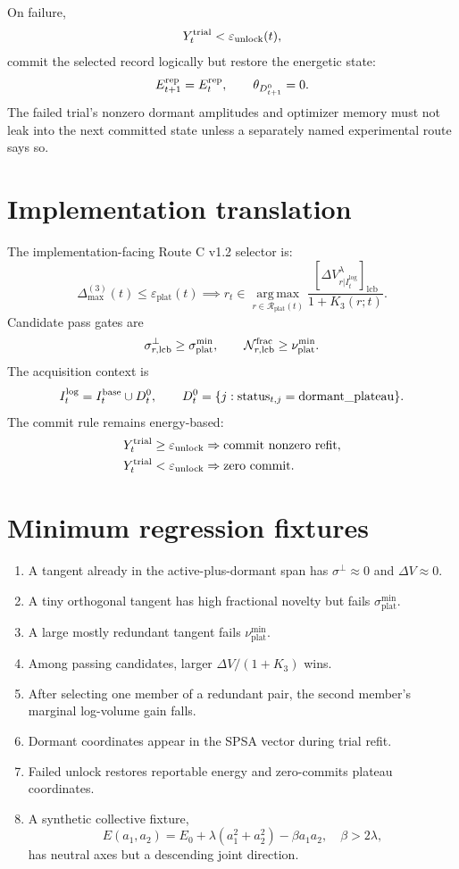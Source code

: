 \documentclass[10pt,twocolumn]{article}
\newcommand{\argmax}{\operatorname*{arg\,max}}
\newcommand{\eps}{\varepsilon}
\newcommand{\lcb}{\mathrm{lcb}}
\newcommand{\plat}{\mathrm{plat}}
\newcommand{\logi}{\mathrm{log}}
\begin{document}
On failure,
\[
Y_t^{\rm trial}<\eps_{\rm unlock}(t),
\]
commit the selected record logically but restore the energetic state:
\[
E_{t+1}^{\rm rep}=E_t^{\rm rep},
\qquad
\theta_{D_{t+1}^0}=0.
\]
The failed trial's nonzero dormant amplitudes and optimizer memory must not leak
into the next committed state unless a separately named experimental route says
so.

\section{Implementation translation}

The implementation-facing Route C v1.2 selector is:
\[
\Delta_{\max}^{(3)}(t)\le\eps_{\plat}(t)
\implies
r_t\in\argmax_{r\in\mathcal R_{\plat}(t)}
\frac{[\Delta V_{r|I_t^{\logi}}^{\lambda}]_{\lcb}}{1+K_3(r;t)}.
\]
Candidate pass gates are
\[
\sigma_{r,\lcb}^\perp\ge\sigma_{\plat}^{\min},
\qquad
\mathcal N_{r,\lcb}^{\rm frac}\ge\nu_{\plat}^{\min}.
\]
The acquisition context is
\[
I_t^{\logi}=I_t^{\rm base}\cup D_t^0,
\qquad
D_t^0=\{j:\operatorname{status}_{t,j}=\mathrm{dormant\_plateau}\}.
\]
The commit rule remains energy-based:
\begin{align*}
Y_t^{\rm trial}\ge\eps_{\rm unlock}
&\Rightarrow \text{commit nonzero refit},\\
Y_t^{\rm trial}<\eps_{\rm unlock}
&\Rightarrow \text{zero commit}.
\end{align*}

\section{Minimum regression fixtures}

\begin{enumerate}
\item A tangent already in the active-plus-dormant span has
$\sigma^\perp\approx0$ and $\Delta V\approx0$.
\item A tiny orthogonal tangent has high fractional novelty but fails
$\sigma_{\plat}^{\min}$.
\item A large mostly redundant tangent fails $\nu_{\plat}^{\min}$.
\item Among passing candidates, larger $\Delta V/(1+K_3)$ wins.
\item After selecting one member of a redundant pair, the second member's
marginal log-volume gain falls.
\item Dormant coordinates appear in the SPSA vector during trial refit.
\item Failed unlock restores reportable energy and zero-commits plateau
coordinates.
\item A synthetic collective fixture,
\[
E(a_1,a_2)=E_0+\lambda(a_1^2+a_2^2)-\beta a_1a_2,
\quad \beta>2\lambda,
\]
has neutral axes but a descending joint direction.
\end{enumerate}
\end{document}
